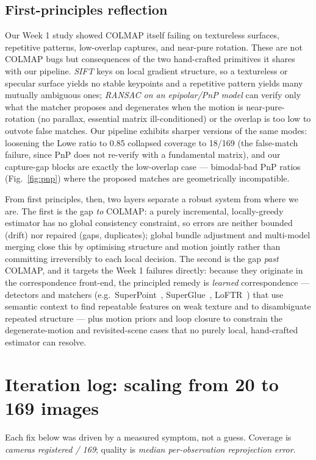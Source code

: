 \documentclass{article} %
\begin{document}
\subsection{First-principles reflection}
Our Week 1 study showed COLMAP itself failing on textureless surfaces, repetitive
patterns, low-overlap captures, and near-pure rotation. These are not COLMAP bugs
but consequences of the two hand-crafted primitives it shares with our pipeline.
\emph{SIFT} keys on local gradient structure, so a textureless or specular surface
yields no stable keypoints and a repetitive pattern yields many mutually ambiguous
ones; \emph{RANSAC on an epipolar/PnP model} can verify only what the matcher
proposes and degenerates when the motion is near-pure-rotation (no parallax,
essential matrix ill-conditioned) or the overlap is too low to outvote false
matches. Our pipeline exhibits sharper versions of the same modes: loosening the
Lowe ratio to 0.85 collapsed coverage to 18/169 (the false-match failure, since PnP
does not re-verify with a fundamental matrix), and our capture-gap blocks are
exactly the low-overlap case --- bimodal-bad PnP ratios (Fig.~\ref{fig:pnp}) where
the proposed matches are geometrically incompatible.

From first principles, then, two layers separate a robust system from where we are.
The first is the gap \emph{to} COLMAP: a purely incremental, locally-greedy
estimator has no global consistency constraint, so errors are neither bounded
(drift) nor repaired (gaps, duplicates); global bundle adjustment and multi-model
merging close this by optimising structure and motion jointly rather than committing
irreversibly to each local decision. The second is the gap \emph{past} COLMAP, and
it targets the Week 1 failures directly: because they originate in the correspondence
front-end, the principled remedy is \emph{learned} correspondence --- detectors and
matchers (e.g.\ SuperPoint~\citep{detone2018superpoint},
SuperGlue~\citep{sarlin2020superglue}, LoFTR~\citep{sun2021loftr}) that use semantic context to find
repeatable features on weak texture and to disambiguate repeated structure --- plus
motion priors and loop closure to constrain the degenerate-motion and revisited-scene
cases that no purely local, hand-crafted estimator can resolve.




\appendix

\section{Iteration log: scaling from 20 to 169 images}
Each fix below was driven by a measured symptom, not a guess. Coverage is
\emph{cameras registered / 169}; quality is \emph{median per-observation
reprojection error}.
\end{document}
